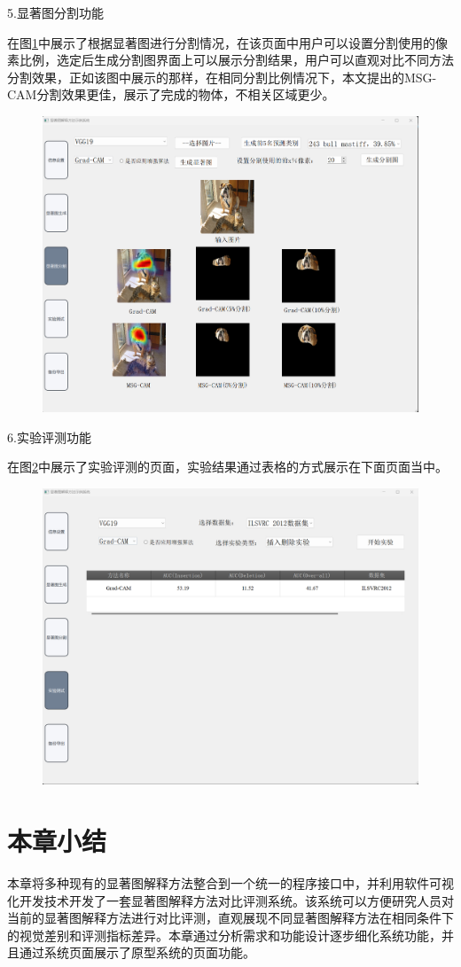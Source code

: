 5.显著图分割功能

在图\ref{fig:f5}中展示了根据显著图进行分割情况，在该页面中用户可以设置分割使用的像素比例，选定后生成分割图界面上可以展示分割结果，用户可以直观对比不同方法分割效果，正如该图中展示的那样，在相同分割比例情况下，本文提出的MSG-CAM分割效果更佳，展示了完成的物体，不相关区域更少。

\begin{figure}[h]
	\centering 
	\includegraphics[width=12cm]{fig/ch5/f5.png}
	\label{fig:f5}
\end{figure}

6.实验评测功能

在图\ref{fig:f6}中展示了实验评测的页面，实验结果通过表格的方式展示在下面页面当中。

\begin{figure}[h]
	\centering 
	\includegraphics[width=12cm]{fig/ch5/f6.png}
	\label{fig:f6}
\end{figure}

\section{本章小结}
本章将多种现有的显著图解释方法整合到一个统一的程序接口中，并利用软件可视化开发技术开发了一套显著图解释方法对比评测系统。该系统可以方便研究人员对当前的显著图解释方法进行对比评测，直观展现不同显著图解释方法在相同条件下的视觉差别和评测指标差异。本章通过分析需求和功能设计逐步细化系统功能，并且通过系统页面展示了原型系统的页面功能。